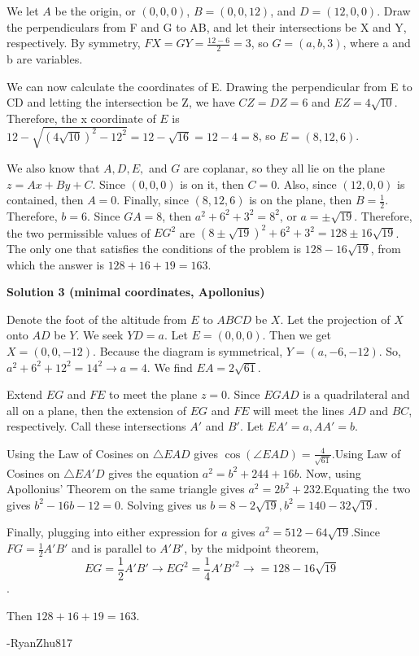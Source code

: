 \begin{enumerate}
We let $A$ be the origin, or $(0,0,0)$, $B = (0,0,12)$, and $D = (12,0,0)$. Draw the perpendiculars from F and G to AB, and let their intersections be X and Y, respectively. By symmetry, $FX = GY = \frac{12-6}2 = 3$, so $G = (a,b,3)$, where a and b are variables. 

 We can now calculate the coordinates of E. Drawing the perpendicular from E to CD and letting the intersection be Z, we have $CZ = DZ = 6$ and $EZ = 4\sqrt{10}$. Therefore, the x coordinate of $E$ is $12-\sqrt{(4\sqrt{10})^2-12^2}=12-\sqrt{16}=12-4=8$, so $E = (8,12,6)$.

 We also know that $A,D,E,$ and $G$ are coplanar, so they all lie on the plane $z = Ax+By+C$. Since $(0,0,0)$ is on it, then $C = 0$. Also, since $(12,0,0)$ is contained, then $A = 0$. Finally, since $(8,12,6)$ is on the plane, then $B = \frac 12$. Therefore, $b = 6$. Since $GA = 8$, then $a^2+6^2+3^2=8^2$, or $a = \pm \sqrt{19}$. Therefore, the two permissible values of $EG^2$ are $(8 \pm \sqrt{19})^2+6^2+3^2 = 128 \pm 16\sqrt{19}$. The only one that satisfies the conditions of the problem is $128 - 16\sqrt{19}$, from which the answer is $128+16+19=\boxed{163}$.

 



\textbf{Solution 3 (minimal coordinates, Apollonius)}

Denote the foot of the altitude from $E$ to $ABCD$ be $X$. Let the projection of $X$ onto $AD$ be $Y$. We seek $YD=a$. Let $E=(0, 0, 0)$. Then we get $X=(0, 0, -12)$. Because the diagram is symmetrical, $Y=(a, -6, -12)$. So, $a^2+6^2+12^2=14^2 \rightarrow a=4$. We find $EA=2\sqrt{61}$.

 Extend $EG$ and $FE$ to meet the plane $z=0$. Since $EGAD$ is a quadrilateral and all on a plane, then the extension of $EG$ and $FE$ will meet the lines $AD$ and $BC$, respectively. Call these intersections $A'$ and $B'$. Let $EA'=a, AA'=b$.

 Using the Law of Cosines on $\triangle EAD$ gives $\cos(\angle EAD)=\frac{4}{\sqrt{61}}$.Using Law of Cosines on $\triangle EA'D$ gives the equation $a^2=b^2+244+16b$. Now, using Apollonius' Theorem on the same triangle gives $a^2=2b^2+232$.Equating the two gives $b^2-16b-12=0$. Solving gives us $b=8-2\sqrt{19}, b^2=140-32\sqrt{19}$.

 Finally, plugging into either expression for $a$ gives $a^2=512-64\sqrt{19}$.Since $FG=\frac{1}{2}A'B'$ and is parallel to $A'B'$, by the midpoint theorem, 
 \[EG=\frac{1}{2} A'B' \rightarrow EG^2=\frac{1}{4}A'B'^2 \rightarrow = 128-16\sqrt{19}\].

 Then $128+16+19=163$.

 -RyanZhu817

 


\end{enumerate}